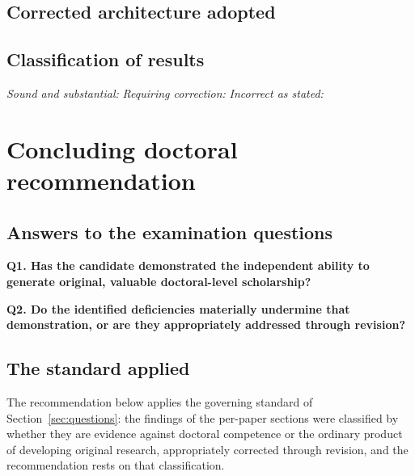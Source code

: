 \documentclass[11pt]{article}
\newif\ifdraftnotes     \draftnotesfalse     %
\newcommand{\note}[1]{\ifdraftnotes\textcolor{red}{\small[\,#1\,]}\fi}
\begin{document}
\subsection*{Corrected architecture adopted}

\note{The revised paper, as a numbered sequence of its components.}

\subsection*{Classification of results}

\emph{Sound and substantial:} \note{\dots}
\emph{Requiring correction:} \note{\dots}
\emph{Incorrect as stated:} \note{\dots}

\clearpage
\section{Concluding doctoral recommendation}\label{sec:recommendation}

\subsection{Answers to the examination questions}

\textbf{Q1. Has the candidate demonstrated the independent ability to generate
original, valuable doctoral-level scholarship?} \note{Yes / No.} \note{The
grounds, drawn from the record and not from the number of papers alone.}

\textbf{Q2. Do the identified deficiencies materially undermine that
demonstration, or are they appropriately addressed through revision?}
\note{Answer.} \note{The grounds: localisation of every fatal or major finding;
survival of the load-bearing contributions; the evidential weight of the
candidate's responses.}

\subsection{The standard applied}

The recommendation below applies the governing standard of
Section~\ref{sec:questions}: the findings of the per-paper sections were
classified by whether they are evidence against doctoral competence or the
ordinary product of developing original research, appropriately corrected
through revision, and the recommendation rests on that classification.
\end{document}
